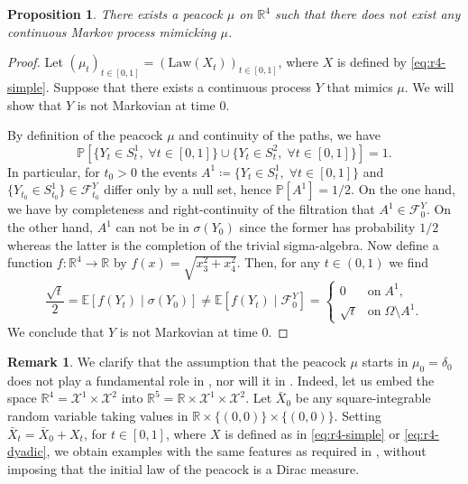 \documentclass[12pt,oneside]{amsart}
\newtheorem{proposition}[theorem]{Proposition}
\theoremstyle{definition}
\newtheorem{remark}[theorem]{Remark}
\newcommand{\F}{\mathcal F}
\newcommand{\Law}{\mathrm{Law}}
\newcommand{\R}{\mathbb R}
\newcommand{\X}{\mathcal X}
\def\P{{\mathbb P}}
\def\E{{\mathbb E}}
\def\R{{\mathbb R}}
\numberwithin{equation}{section}
\begin{document}
\begin{proposition}\label{prop:ex-continuous}
	There exists a peacock $\mu$ on $\R^4$ such that there does not exist any continuous Markov process mimicking $\mu$.
\end{proposition}

\begin{proof}
	Let $(\mu_t)_{t \in [0, 1]} = (\Law(X_t))_{t \in [0, 1]}$, where $X$ is defined by \eqref{eq:r4-simple}. Suppose that there exists a continuous process $Y$ that mimics $\mu$. We will show that $Y$ is not Markovian at time $0$.
	
	By definition of the peacock $\mu$ and continuity of the paths, we have
	\begin{equation}
		\P\!\left[ \{ Y_t \in S^1_t, \; \forall t \in [0, 1] \} \cup \{  Y_t \in S^2_t, \; \forall t \in [0, 1] \} \right]\! = 1.
	\end{equation}
	In particular, for $t_0 > 0$ the events $A^1 \coloneqq \{ Y_t \in S_t^1, \; \forall t \in [0,1]\}$ and $\{ Y_{t_0} \in S^1_{t_0} \} \in \F^Y_{t_0}$ differ only by a null set, hence $\P[A^1] = 1/2$.
    On the one hand, we have by completeness and right-continuity of the filtration that $A^1 \in \F^Y_0$.
    On the other hand, $A^1$ can not be in $\sigma(Y_0)$ since the former has probability $1/2$ whereas the latter is the completion of the trivial sigma-algebra.
    Now define a function $f\colon \R^4 \to \R$ by $f(x) = \sqrt{x_3^2 + x_4^2}$. Then, for any $t \in (0, 1)$ we find
	\begin{equation}
		\frac{\sqrt{t}}{2} = \E [f(Y_t) \mid \sigma(Y_0)] \neq \E[f(Y_t) \mid \F^Y_0] =
		\begin{cases}
			0 & \text{on}\; A^1,\\
			\sqrt{t} & \text{on} \; \Omega \setminus A^1.
		\end{cases}
	\end{equation}
	 We conclude that $Y$ is not Markovian at time $0$.
\end{proof}

\begin{remark}\label{rem:initial-law}
	We clarify that the assumption that the peacock $\mu$ starts in $\mu_0 = \delta_0$ does not play a fundamental role in , nor will it in . Indeed, let us embed the space $\R^4 = \X^1 \times \X^2$ into $\R^5 = \R \times \X^1 \times \X^2$. Let $\bar X_0$ be any square-integrable random variable taking values in $\R \times \{(0, 0)\} \times \{(0, 0)\}$. Setting $\bar X_t = \bar X_0 + X_t$, for $t \in [0, 1]$, where $X$ is defined as in \eqref{eq:r4-simple} or \eqref{eq:r4-dyadic}, we obtain examples with the same features as required in , without imposing that the initial law of the peacock is a Dirac measure.
\end{remark}
\end{document}
